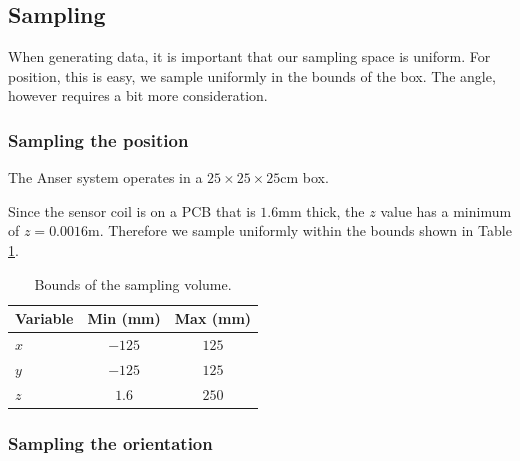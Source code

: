 

\subsection{Sampling}
When generating data, it is important that our sampling space is uniform. For position, this is easy, we sample uniformly in the bounds of the box. The angle, however requires a bit more consideration.

\subsubsection{Sampling the position}
The Anser system operates in a $25 \times 25 \times25$cm box. 

Since the sensor coil is on a PCB that is $1.6$mm thick, the $z$ value has a minimum of $z = 0.0016$m. Therefore we sample uniformly within the bounds shown in Table \ref{tab:pos_bounds}. 

\begin{table}
  \centering
  \begin{tabular}{lcc}
    \toprule
    Variable & Min (mm) & Max (mm) \\
    \midrule
    $x$ & $-125$ & $125$ \\
    $y$ & $-125$ & $125$ \\
    $z$ & $1.6$ & $250$ \\
    \bottomrule
  \end{tabular}
  \caption{Bounds of the sampling volume.}
  \label{tab:pos_bounds}
\end{table}
\subsubsection{Sampling the orientation}

